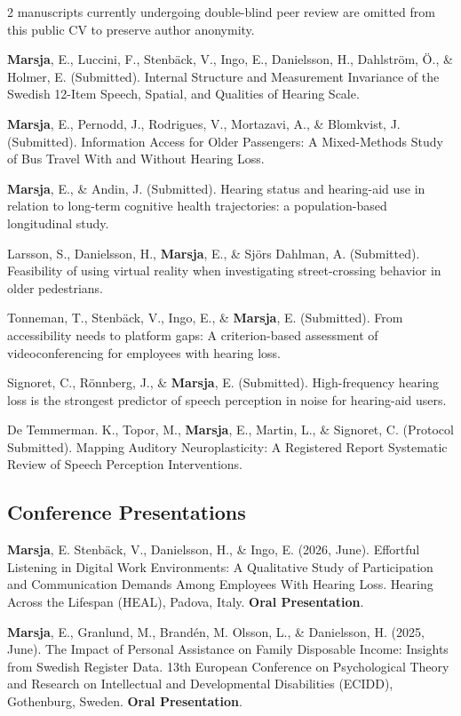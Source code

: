 \documentclass[]{article}
\begin{document}
2 manuscripts currently undergoing double-blind peer review are omitted
from this public CV to preserve author anonymity.

\textbf{Marsja}, E., Luccini, F., Stenbäck, V., Ingo, E., Danielsson,
H., Dahlström, Ö., \& Holmer, E. (Submitted). Internal Structure and
Measurement Invariance of the Swedish 12-Item Speech, Spatial, and
Qualities of Hearing Scale.

\textbf{Marsja}, E., Pernodd, J., Rodrigues, V., Mortazavi, A., \&
Blomkvist, J. (Submitted). Information Access for Older Passengers: A
Mixed-Methods Study of Bus Travel With and Without Hearing Loss.

\textbf{Marsja}, E., \& Andin, J. (Submitted). Hearing status and
hearing-aid use in relation to long-term cognitive health trajectories:
a population-based longitudinal study.

Larsson, S., Danielsson, H., \textbf{Marsja}, E., \& Sjörs Dahlman, A.
(Submitted). Feasibility of using virtual reality when investigating
street-crossing behavior in older pedestrians.

Tonneman, T., Stenbäck, V., Ingo, E., \& \textbf{Marsja}, E.
(Submitted). From accessibility needs to platform gaps: A
criterion-based assessment of videoconferencing for employees with
hearing loss.

Signoret, C., Rönnberg, J., \& \textbf{Marsja}, E. (Submitted).
High-frequency hearing loss is the strongest predictor of speech
perception in noise for hearing-aid users.

De Temmerman. K., Topor, M., \textbf{Marsja}, E., Martin, L., \&
Signoret, C. (Protocol Submitted). Mapping Auditory Neuroplasticity: A
Registered Report Systematic Review of Speech Perception Interventions.

\subsection{Conference Presentations}\label{conference-presentations}

\textbf{Marsja}, E. Stenbäck, V., Danielsson, H., \& Ingo, E. (2026,
June). Effortful Listening in Digital Work Environments: A Qualitative
Study of Participation and Communication Demands Among Employees With
Hearing Loss. Hearing Across the Lifespan (HEAL), Padova, Italy.
\textbf{Oral Presentation}.

\textbf{Marsja}, E., Granlund, M., Brandén, M. Olsson, L., \&
Danielsson, H. (2025, June). The Impact of Personal Assistance on Family
Disposable Income: Insights from Swedish Register Data. 13th European
Conference on Psychological Theory and Research on Intellectual and
Developmental Disabilities (ECIDD), Gothenburg, Sweden. \textbf{Oral
Presentation}.
\end{document}
